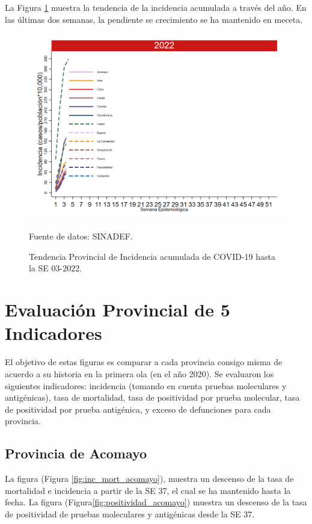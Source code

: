 \documentclass[12pt,a4paper,openany]{book}
\begin{document}
La Figura \ref{fig:incidencia_provincial} muestra la tendencia de la incidencia acumulada a través del año. En las últimas dos semanas, la pendiente se crecimiento se ha mantenido en meceta. 
%
\begin{figure}[h]
	\caption{Tendencia Provincial de Incidencia acumulada de COVID-19 hasta la SE 03-2022. }\label{fig:incidencia_provincial}
	\begin{center}
		\includegraphics[width=0.65\linewidth]{../figuras/incidencia_provincial_2022.png}
	\end{center}
	{\footnotesize {Fuente de datos: SINADEF.}}
\end{figure}

\clearpage
	
\section*{Evaluación Provincial de 5 Indicadores}
		\noindent El objetivo de estas figuras es comparar a cada provincia consigo misma de acuerdo a su historia  en la primera ola (en el año 2020). Se evaluaron los siguientes indicadores: incidencia (tomando en cuenta pruebas moleculares y antigénicas), tasa de mortalidad, tasa de positividad por prueba molecular, tasa de positividad por prueba antigénica, y exceso de defunciones para cada provincia.
		
		\subsection*{Provincia de Acomayo}
		\noindent La figura (Figura \ref{fig:inc_mort_acomayo}),  muestra un descenso de la tasa de mortalidad e incidencia a partir de la SE 37, el cual se ha mantenido hasta la fecha. 
		\noindent La figura (Figura\ref{fig:positividad_acomayo}) muestra un descenso de la tasa de positividad de pruebas moleculares y antigénicas desde la SE 37.
		
\end{document}
